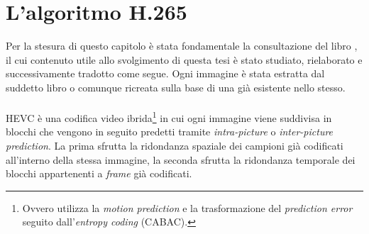 
\chapter{L'algoritmo H.265} %

\label{Chapter4} %

Per la stesura di questo capitolo è stata fondamentale la consultazione del
libro \citep{BookHEVC}, il cui contenuto utile allo svolgimento di questa tesi è
stato studiato, rielaborato e successivamente tradotto come segue. Ogni immagine
è stata estratta dal suddetto libro o comunque ricreata sulla base di una già
esistente nello stesso.
\\ \\
HEVC è una codifica video ibrida\footnote{Ovvero utilizza la \emph{motion 
prediction} e la trasformazione del \emph{prediction error} seguito
dall'\emph{entropy coding} (CABAC).} in cui ogni immagine viene suddivisa in 
blocchi  che vengono in seguito predetti tramite \emph{intra-picture} o
\emph{inter-picture prediction}. La prima sfrutta la ridondanza spaziale dei
campioni già codificati all'interno della stessa immagine, la seconda sfrutta
la ridondanza temporale dei blocchi appartenenti a \emph{frame} già codificati.

